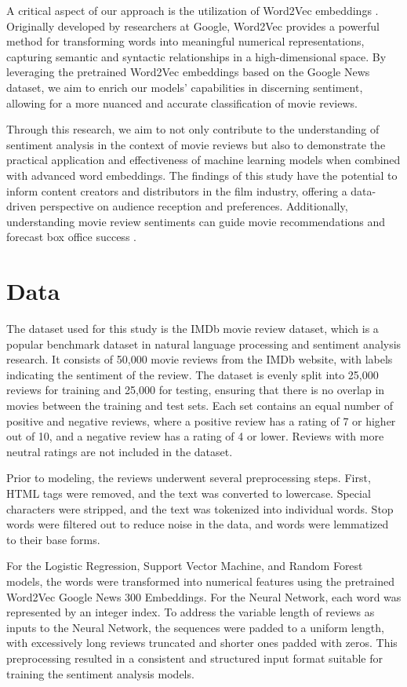\documentclass[conference]{IEEEtran}
\begin{document}
	A critical aspect of our approach is the utilization of Word2Vec embeddings . Originally developed by researchers at Google, Word2Vec provides a powerful method for transforming words into meaningful numerical representations, capturing semantic and syntactic relationships in a high-dimensional space. By leveraging the pretrained Word2Vec embeddings based on the Google News dataset, we aim to enrich our models' capabilities in discerning sentiment, allowing for a more nuanced and accurate classification of movie reviews.

	Through this research, we aim to not only contribute to the understanding of sentiment analysis in the context of movie reviews but also to demonstrate the practical application and effectiveness of machine learning models when combined with advanced word embeddings. The findings of this study have the potential to inform content creators and distributors in the film industry, offering a data-driven perspective on audience reception and preferences. Additionally, understanding movie review sentiments can guide movie recommendations and forecast box office success .
	
	\section{Data}
	
	The dataset used for this study is the IMDb movie review dataset, which is a popular benchmark dataset in natural language processing and sentiment analysis research. It consists of 50,000 movie reviews from the IMDb website, with labels indicating the sentiment of the review. The dataset is evenly split into 25,000 reviews for training and 25,000 for testing, ensuring that there is no overlap in movies between the training and test sets. Each set contains an equal number of positive and negative reviews, where a positive review has a rating of 7 or higher out of 10, and a negative review has a rating of 4 or lower. Reviews with more neutral ratings are not included in the dataset.

	Prior to modeling, the reviews underwent several preprocessing steps. First, HTML tags were removed, and the text was converted to lowercase. Special characters were stripped, and the text was tokenized into individual words. Stop words were filtered out to reduce noise in the data, and words were lemmatized to their base forms.

	For the Logistic Regression, Support Vector Machine, and Random Forest models, the words were transformed into numerical features using the pretrained Word2Vec Google News 300 Embeddings. For the Neural Network, each word was represented by an integer index. To address the variable length of reviews as inputs to the Neural Network, the sequences were padded to a uniform length, with excessively long reviews truncated and shorter ones padded with zeros. This preprocessing resulted in a consistent and structured input format suitable for training the sentiment analysis models.
\end{document}
